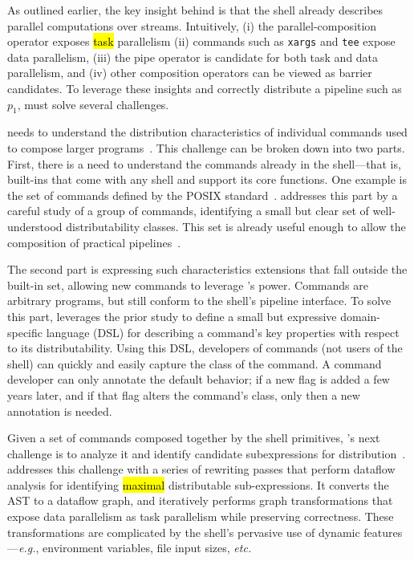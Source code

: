 \documentclass[sigplan,10pt,review,anonymous]{acmart}
\newcommand{\eg}{{\em e.g.}, }
\newcommand{\etc}{{\em etc.}\xspace}
\newcommand{\ttt}[1]{\texttt{\small #1}}
\newcommand{\todo}[1]{\hl{#1}\xspace}
\newcommand{\nv}[1]{[{\color{cyan}#1 --- Nikos}]}
\newcommand{\kk}[1]{[{\color{magenta}#1 --- kk}]}
\begin{document}
As outlined earlier, the key insight behind \sys is that the shell already describes parallel computations over streams.
Intuitively,
 (i) the parallel-composition operator exposes \todo{task} parallelism
 (ii) commands such as \ttt{xargs} and \ttt{tee} expose data parallelism,
 (iii) the pipe operator is candidate for both task and data parallelism, and
 (iv)  other composition operators can be viewed as barrier candidates.
To leverage these insights and correctly distribute a pipeline such as $p_1$, \sys must solve several challenges.

\sys needs to understand the distribution characteristics of individual commands used to compose larger programs~.
This challenge can be broken down into two parts.
First, there is a need to understand the commands already in the shell---that is, built-ins that come with any shell and support its core functions.
One example is the set of commands defined by the \textsc{POSIX} standard~\cite{}.
\sys addresses this part by a careful study of a group of commands, identifying a small but clear set of well-understood distributability classes.
This set is already useful enough to allow the composition of practical pipelines~.

The second part is expressing such characteristics extensions that fall outside the built-in set, allowing new commands to leverage \sys's power.
Commands are arbitrary programs, but still conform to the shell's pipeline interface.
To solve this part, \sys leverages the prior study to define a small but expressive domain-specific language (DSL) for describing a command's key properties with respect to its distributability.
Using this DSL, developers of commands (not users of the shell) can quickly and easily capture the class of the command.
A command developer can only annotate the default behavior;
  if a new flag is added a few years later, and if that flag alters the command's class, only then a new annotation is needed.

Given a set of commands composed together by the shell primitives, \sys's next challenge is to analyze it and identify candidate subexpressions for distribution~.
\sys addresses this challenge with a series of rewriting passes that perform dataflow analysis for identifying \todo{maximal} distributable sub-expressions.
It converts the AST to a dataflow graph, and iteratively performs graph transformations that expose data parallelism as task parallelism while preserving correctness.
These transformations are complicated by the shell's pervasive use of dynamic features---\eg environment variables, file input sizes, \etc
\end{document}
